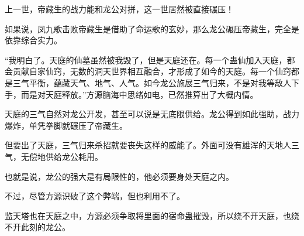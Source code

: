 \begin{this_body}
上一世，帝藏生的战力能和龙公对拼，这一世居然被直接碾压！

如果说，凤九歌击败帝藏生是借助了命运歌的玄妙，那么龙公碾压帝藏生，完全是依靠综合实力。

“我明白了。天庭的仙墓虽然被我毁了，但是天庭还在。每一个蛊仙加入天庭，都会贡献自家仙窍，无数的洞天世界相互融合，才形成了如今的天庭。每一个仙窍都是三气平衡，蕴藏天气、地气、人气。如今龙公施展三气归来，不是对我等敌人下手，而是对天庭释放。”方源脑海中思绪如电，已然推算出了大概内情。

天庭的三气自然对龙公开发，甚至可以说是无底限供给。龙公得到如此强助，战力爆炸，单凭拳脚就碾压了帝藏生。

但要出了天庭，三气归来杀招就要丧失这样的威能了。外面可没有雄浑的天地人三气，无偿地供给龙公耗用。

也就是说，龙公的强大是有局限性的，他必须要身处天庭之内。

不过，尽管方源识破了这个弊端，但也利用不了。

监天塔也在天庭之中，方源必须争取将里面的宿命蛊摧毁，所以绕不开天庭，也绕不开此刻的龙公。

\end{this_body}

